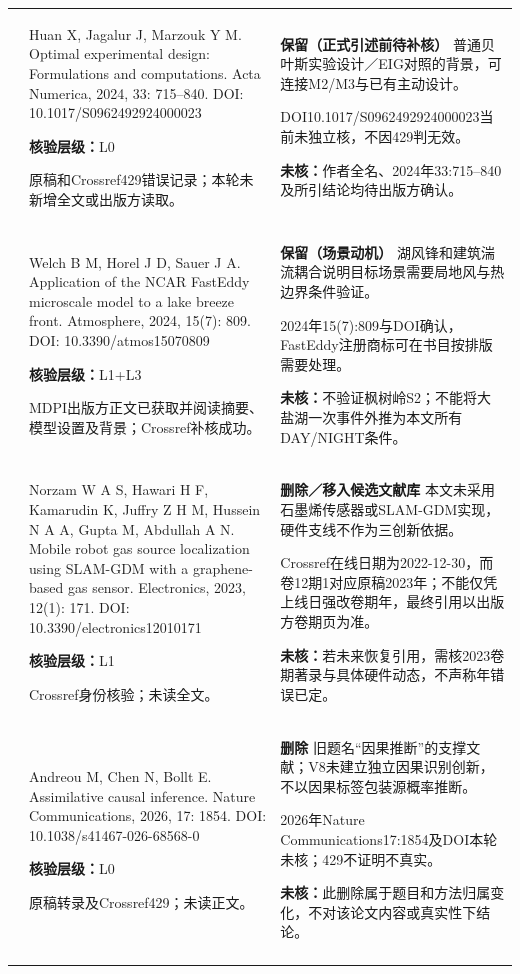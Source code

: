 \begin{longtable}{@{}>{\raggedright\arraybackslash}p{0.7cm}>{\raggedright\arraybackslash}p{7.0cm}>{\raggedright\arraybackslash}p{7.8cm}@{}}
13 & Huan X, Jagalur J, Marzouk Y M. Optimal experimental design: Formulations and computations. Acta Numerica, 2024, 33: 715–840. DOI: 10.1017/S0962492924000023\par\textbf{核验层级：}L0\par 原稿和Crossref429错误记录；本轮未新增全文或出版方读取。 & \textbf{保留（正式引述前待补核）} 普通贝叶斯实验设计／EIG对照的背景，可连接M2/M3与已有主动设计。\par DOI10.1017/S0962492924000023当前未独立核，不因429判无效。\par\textbf{未核：}作者全名、2024年33:715–840及所引结论均待出版方确认。 \\\addlinespace[6pt]
14 & Welch B M, Horel J D, Sauer J A. Application of the NCAR FastEddy microscale model to a lake breeze front. Atmosphere, 2024, 15(7): 809. DOI: 10.3390/atmos15070809\par\textbf{核验层级：}L1+L3\par MDPI出版方正文已获取并阅读摘要、模型设置及背景；Crossref补核成功。 & \textbf{保留（场景动机）} 湖风锋和建筑湍流耦合说明目标场景需要局地风与热边界条件验证。\par 2024年15(7):809与DOI确认，FastEddy注册商标可在书目按排版需要处理。\par\textbf{未核：}不验证枫树岭S2；不能将大盐湖一次事件外推为本文所有DAY/NIGHT条件。 \\\addlinespace[6pt]
15 & Norzam W A S, Hawari H F, Kamarudin K, Juffry Z H M, Hussein N A A, Gupta M, Abdullah A N. Mobile robot gas source localization using SLAM-GDM with a graphene-based gas sensor. Electronics, 2023, 12(1): 171. DOI: 10.3390/electronics12010171\par\textbf{核验层级：}L1\par Crossref身份核验；未读全文。 & \textbf{删除／移入候选文献库} 本文未采用石墨烯传感器或SLAM-GDM实现，硬件支线不作为三创新依据。\par Crossref在线日期为2022-12-30，而卷12期1对应原稿2023年；不能仅凭上线日强改卷期年，最终引用以出版方卷期页为准。\par\textbf{未核：}若未来恢复引用，需核2023卷期著录与具体硬件动态，不声称年错误已定。 \\\addlinespace[6pt]
16 & Andreou M, Chen N, Bollt E. Assimilative causal inference. Nature Communications, 2026, 17: 1854. DOI: 10.1038/s41467-026-68568-0\par\textbf{核验层级：}L0\par 原稿转录及Crossref429；未读正文。 & \textbf{删除} 旧题名“因果推断”的支撑文献；V8未建立独立因果识别创新，不以因果标签包装源概率推断。\par 2026年Nature Communications17:1854及DOI本轮未核；429不证明不真实。\par\textbf{未核：}此删除属于题目和方法归属变化，不对该论文内容或真实性下结论。 \\\addlinespace[6pt]

\end{longtable}
